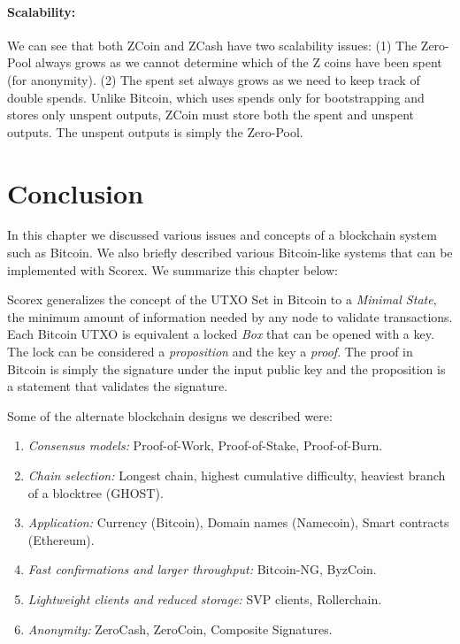 \documentclass[]{report}   %
\begin{document}
\paragraph{Scalability:} We can see that both ZCoin and ZCash have two scalability issues: (1) The Zero-Pool always grows as we cannot determine which of the Z coins have been spent (for anonymity). (2) The spent set always grows as we need to keep track of double spends. Unlike Bitcoin, which uses spends only for bootstrapping and stores only unspent outputs, ZCoin must store both the spent and unspent outputs. The unspent outputs is simply the Zero-Pool.

\section{Conclusion}

In this chapter we discussed various issues and concepts of a blockchain system such as Bitcoin. We also briefly described various Bitcoin-like systems that can be implemented with Scorex. We summarize this chapter below:

Scorex generalizes the concept of the UTXO Set in Bitcoin to a {\em Minimal State}, the minimum amount of information needed by any node to validate transactions. Each Bitcoin UTXO is equivalent a locked {\em Box} that can be opened with a key. The lock can be considered a {\em proposition} and the key a {\em proof}. The proof in Bitcoin is simply the signature under the input public key and the proposition is a statement that validates the signature.

Some of the alternate blockchain designs we described were:

\begin{enumerate}
	\item {\em Consensus models:} Proof-of-Work, Proof-of-Stake, Proof-of-Burn.
	\item {\em Chain selection:} Longest chain, highest cumulative difficulty, heaviest branch of a blocktree (GHOST).
	\item {\em Application:} Currency (Bitcoin), Domain names (Namecoin), Smart contracts (Ethereum).
	\item {\em Fast confirmations and larger throughput:} Bitcoin-NG, ByzCoin.
	\item {\em Lightweight clients and reduced storage:} SVP clients, Rollerchain.
	\item {\em Anonymity:} ZeroCash, ZeroCoin, Composite Signatures.
\end{enumerate}
\end{document}
